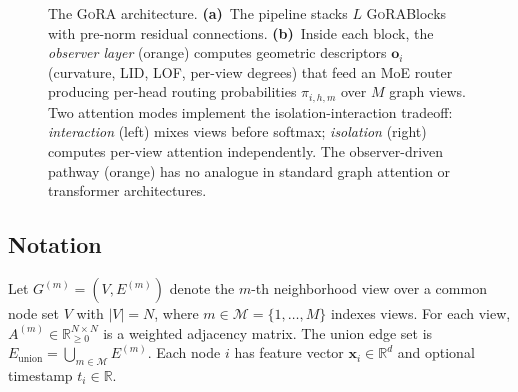\documentclass[11pt,a4paper]{article}
\newcommand{\ours}{\textsc{GoRA}}  %
\newcommand{\RR}{\mathbb{R}}
\newcommand{\calM}{\mathcal{M}}
\newcommand{\calL}{\mathcal{L}}
\begin{document}
\begin{figure}[t]
\caption{The \ours{} architecture.
\textbf{(a)}~The pipeline stacks $L$ \ours{}Blocks with pre-norm
residual connections.
\textbf{(b)}~Inside each block, the \emph{observer layer} (orange)
computes geometric descriptors $\mathbf{o}_i$ (curvature, LID, LOF,
per-view degrees) that feed an MoE router producing per-head routing
probabilities $\pi_{i,h,m}$ over $M$ graph views.
Two attention modes implement the isolation-interaction tradeoff:
\emph{interaction} (left) mixes views before softmax;
\emph{isolation} (right) computes per-view attention independently.
The observer-driven pathway (orange) has no analogue in standard
graph attention or transformer architectures.}
\label{fig:architecture}
\end{figure}

\subsection{Notation}
\label{sec:prelim}

Let $G^{(m)} = (V, E^{(m)})$ denote the $m$-th neighborhood view over
a common node set $V$ with $|V| = N$, where
$m \in \calM = \{1, \ldots, M\}$ indexes views.
For each view, $A^{(m)} \in \RR_{\ge 0}^{N \times N}$ is a weighted
adjacency matrix.
The union edge set is
$E_{\mathrm{union}} = \bigcup_{m \in \calM} E^{(m)}$.
Each node $i$ has feature vector $\mathbf{x}_i \in \RR^{d}$ and
optional timestamp $t_i \in \RR$.
\end{document}
